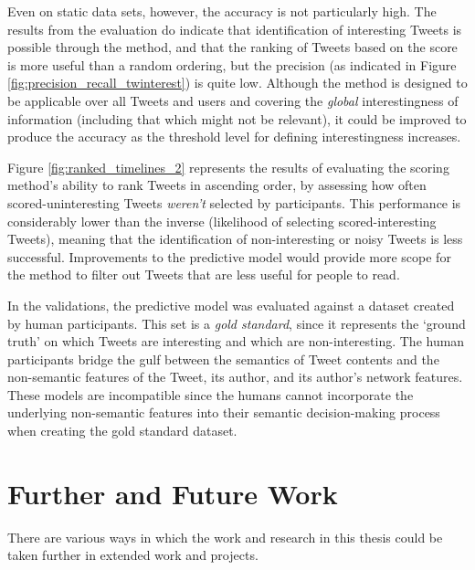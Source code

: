 Even on static data sets, however, the accuracy is not particularly high. The results from the evaluation do indicate that identification of interesting Tweets is possible through the method, and that the ranking of Tweets based on the score is more useful than a random ordering, but the precision (as indicated in Figure \ref{fig:precision_recall_twinterest}) is quite low. Although the method is designed to be applicable over all Tweets and users and covering the \textit{global} interestingness of information (including that which might not be relevant), it could be improved to produce the accuracy as the threshold level for defining interestingness increases.

Figure \ref{fig:ranked_timelines_2} represents the results of evaluating the scoring method's ability to rank Tweets in ascending order, by assessing how often scored-uninteresting Tweets \textit{weren't} selected by participants. This performance is considerably lower than the inverse (likelihood of selecting scored-interesting Tweets), meaning that the identification of non-interesting or noisy Tweets is less successful. Improvements to the predictive model would provide more scope for the method to filter out Tweets that are less useful for people to read.

In the validations, the predictive model was evaluated against a dataset created by human participants. This set is a \textit{gold standard}, since it represents the `ground truth' on which Tweets are interesting and which are non-interesting. The human participants bridge the gulf between the semantics of Tweet contents and the non-semantic features of the Tweet, its author, and its author's network features. These models are incompatible since the humans cannot incorporate the underlying non-semantic features into their semantic decision-making process when creating the gold standard dataset.

\section{Further and Future Work}
There are various ways in which the work and research in this thesis could be taken further in extended work and projects.



